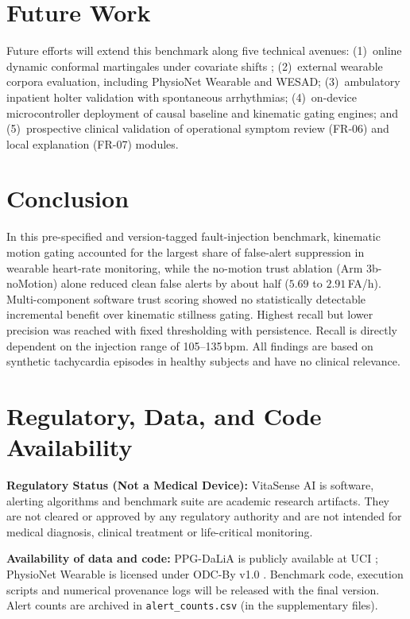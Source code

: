 \documentclass[conference]{IEEEtran}
\begin{document}


\section{Future Work}
Future efforts will extend this benchmark along five technical avenues: (1)~online dynamic conformal martingales under covariate shifts \cite{ref_vazquez_conformal}; (2)~external wearable corpora evaluation, including PhysioNet Wearable \cite{ref_physionet_wearable} and WESAD; (3)~ambulatory inpatient holter validation with spontaneous arrhythmias; (4)~on-device microcontroller deployment of causal baseline and kinematic gating engines; and (5)~prospective clinical validation of operational symptom review (FR-06) and local explanation (FR-07) modules.

\section{Conclusion}
In this pre-specified and version-tagged fault-injection benchmark, kinematic motion gating accounted for the largest share of false-alert suppression in wearable heart-rate monitoring, while the no-motion trust ablation (Arm 3b-noMotion) alone reduced clean false alerts by about half ($5.69$ to $2.91$\,FA/h). Multi-component software trust scoring showed no statistically detectable incremental benefit over kinematic stillness gating. Highest recall but lower precision was reached with fixed thresholding with persistence. Recall is directly dependent on the injection range of 105--135\,bpm. All findings are based on synthetic tachycardia episodes in healthy subjects and have no clinical relevance.

\section*{Regulatory, Data, and Code Availability}
\textbf{Regulatory Status (Not a Medical Device):} VitaSense AI is software, alerting algorithms and benchmark suite are academic research artifacts. They are not cleared or approved by any regulatory authority and are not intended for medical diagnosis, clinical treatment or life-critical monitoring.

\textbf{Availability of data and code:} PPG-DaLiA is publicly available at UCI \cite{ref_reiss_dalia, ref_uci_dalia}; PhysioNet Wearable is licensed under ODC-By v1.0 \cite{ref_physionet_wearable}. Benchmark code, execution scripts and numerical provenance logs will be released with the final version. Alert counts are archived in \texttt{alert\_counts.csv} (in the supplementary files).
\end{document}
